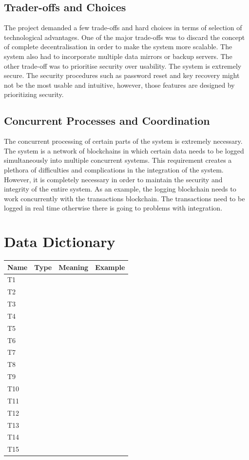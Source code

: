 \documentclass[a4paper,twoside,phd]{BYUPhys}
\begin{document}
\subsection{Trader-offs and Choices}
The project demanded a few trade-offs and hard choices in terms of selection of technological advantages. One of the major trade-offs was to discard the concept of complete decentralisation in order to make the system more scalable. The system also had to incorporate multiple data mirrors or backup servers. The other trade-off was to prioritise security over usability. The system is extremely secure. The security procedures such as password reset and key recovery might not be the most usable and intuitive, however, those features are designed by prioritizing security.
\subsection{Concurrent Processes and Coordination}
The concurrent processing of certain parts of the system is extremely necessary. The system is a network of blockchains in which certain data needs to be logged simultaneously into multiple concurrent systems. This requirement creates a plethora of difficulties and complications in the integration of the system. However, it is completely necessary in order to maintain the security and integrity of the entire system. As an example, the logging blockchain needs to work concurrently with the transactions blockchain. The transactions need to be logged in real time otherwise there is going to problems with integration.

\section{Data Dictionary}
\setlength{\arrayrulewidth}{0.2mm}
\setlength{\tabcolsep}{18pt}
\renewcommand{\arraystretch}{2.5}
 
{
\begin{longtable}{ |p{2.5cm}|p{2.5cm}|p{2.5cm}|p{2.5cm}|  }
\hline
\bf{Name} & \bf{Type} & \bf{Meaning} & \bf{Example}\\
\hline
T1 &   &   &   \\
T2 &   &   &   \\
T3 &   &   &   \\
T4 &   &   &   \\
T5 &   &   &   \\
T6 &   &   &   \\
T7 &   &   &   \\
T8 &   &   &   \\
T9 &   &   &   \\
T10 &   &   &   \\
T11 &   &   &   \\
T12 &   &   &   \\
T13 &   &   &   \\
T14 &   &   &   \\
T15 &   &   &   \\
\hline
\end{longtable}
}
\end{document}
